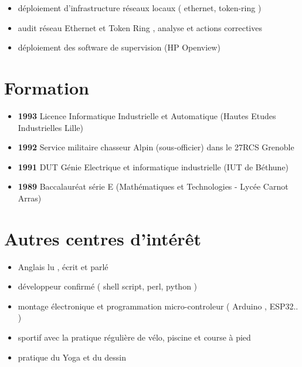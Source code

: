 \documentclass[11pt,a4paper]{moderncv}
\begin{document}
 {}{
\begin{itemize}%
  \item déploiement d'infrastructure réseaux locaux ( ethernet, token-ring  ) 
   \item audit réseau Ethernet et Token Ring , analyse et actions correctives 
   \item déploiement des software de supervision (HP Openview)   \newline
\end{itemize}}


\section{Formation}
\cventry{}{} {}{} {} {
\begin{itemize}
 \item \textbf{ 1993 } Licence Informatique Industrielle et Automatique (Hautes Etudes Industrielles Lille) 
 \item \textbf{ 1992 } Service militaire chasseur Alpin (sous-officier) dans le 27RCS Grenoble 
 \item \textbf{ 1991 } DUT Génie Electrique et informatique industrielle (IUT de Béthune) 
 \item \textbf{ 1989 } Baccalauréat série E (Mathématiques et Technologies - Lycée Carnot Arras)   \newline
 \end{itemize}}

\section{Autres centres d'intérêt}
\cventry{}{} {}{} {} {
\begin{itemize}
 \item  Anglais lu , écrit et parlé   
 \item  développeur confirmé ( shell script, perl, python  ) 
 \item  montage électronique et programmation micro-controleur ( Arduino , ESP32.. ) 
 \item  sportif avec la pratique régulière de vélo, piscine et course à pied   
 \item  pratique du Yoga et du dessin 
 \end{itemize}}
 
\end{document}
